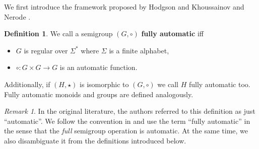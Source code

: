 \documentclass[british,a4paper,11pt,abstract=on]{scrreprt}
\theoremstyle{definition}
\newtheorem{definition}[theorem]{Definition}
\theoremstyle{remark}
\newtheorem*{remark}{Remark}
\begin{document}
We first introduce the framework proposed by Hodgson \autocite{Ho76,Ho83} and Khoussainov and Nerode \autocite{KN}.
\begin{definition} \label{fully automatic group}
    We call a semigroup \((G,\circ)\) \textbf{fully automatic} iff
    \begin{itemize}
        \item \(G\) is regular over \(\Sigma^*\) where \(\Sigma\) is a finite alphabet,
        \item \(\circ : G\times G\to G\) is an automatic function.
    \end{itemize}
    Additionally, if \((H,\star)\) is isomorphic to \((G,\circ)\) we call \(H\) fully automatic too.
    Fully automatic monoids and groups are defined analogously.
\end{definition}

\begin{remark}
    In the original literature, the authors referred to this definition as just ``automatic''.
    We follow the convention in \autocite{fullautomatatheory} and use the term ``fully automatic'' in the sense that the \textit{full} semigroup operation is automatic.
    At the same time, we also disambiguate it from the definitions introduced below.
\end{remark}
\end{document}
